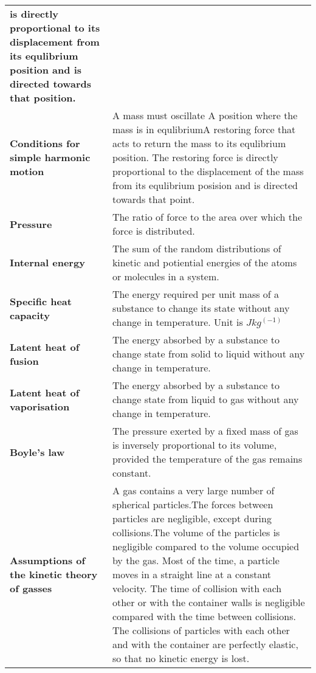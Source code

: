 \documentclass{article}
\begin{document}
\begin{longtable}{>{\bf\centering\arraybackslash}p{1in} 
  p{\textwidth-4\tabcolsep-1in}}
    is directly proportional to its displacement from its equlibrium position
    and is directed towards that position.\\
  Conditions for simple harmonic motion & A mass must oscillate \newline
    \newline A position where the mass is in equlibrium\newline \newline A
    restoring force that acts to return the mass to its equlibrium position. The
    restoring force is directly proportional to the displacement of the mass
    from its equlibrium posision and is directed towards that point.\\ \midrule
  Pressure & The ratio of force to the area over which the force is distributed.
    \\\midrule
  Internal energy & The sum of the random distributions of kinetic and
    potiential energies of the atoms or molecules in a system.\\ \midrule
  Specific heat capacity & The energy required per unit mass of a substance to
    change its state without any change in temperature.\newline \newline
    Unit is $Jkg^(-1)$\\ \midrule
  Latent heat of fusion & The energy absorbed by a substance to change state
    from solid to liquid without any change in temperature. \\ \midrule
  Latent heat of vaporisation & The energy absorbed by a substance to change
    state from liquid to gas without any change in temperature. \\ \midrule
  Boyle's law & The pressure exerted by a fixed mass of gas is inversely
    proportional to its volume, provided the temperature of the gas remains
    constant.\\ \midrule
  Assumptions of the kinetic theory of gasses & A gas contains a very large
    number of spherical particles.\newline \newline The forces between particles
    are negligible, except during collisions.\newline \newline The volume of the particles is negligible compared to the volume occupied by the gas.\newline
    \newline Most of the time, a particle moves in a straight line at a constant velocity. The time of collision with each other or with the container walls
    is negligible compared with the time between collisions.\newline \newline
    The collisions of particles with each other and with the container are 
    perfectly elastic, so that no kinetic energy is lost.\\ \midrule
\end{longtable}
\end{document}
